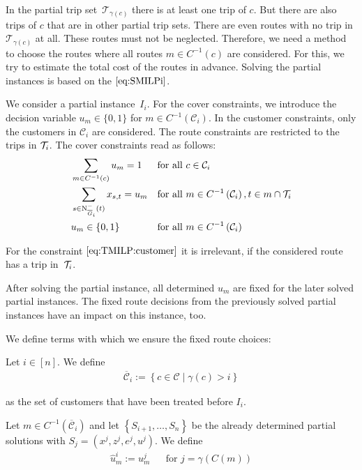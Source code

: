 In the partial trip set~$\mathcal{T}_{\gamma(c)}$ there is at least one trip of $c$. But there are also trips of $c$ that are in other partial trip sets. There are even routes with no trip in $\mathcal{T}_{\gamma(c)}$ at all. These routes must not be neglected. Therefore, we need a method to choose the routes where all routes ${m\in C^{-1}(c)}$ are considered. For this, we try to estimate the total cost of the routes in advance. Solving the partial instances is based on the $\eqref{eq:SMILPi}$.

We consider a partial instance~$I_i$. For the cover constraints, we introduce the decision variable ${u_m\in\{0,1\}}$ for ${m\in C^{-1}\left(\mathcal{C}_i\right)}$. In the customer constraints, only the customers in $\mathcal{C}_i$ are considered. The route constraints are restricted to the trips in $\mathcal{T}_i$. The cover constraints read as follows:
\begin{align}
	& \sum_{m\in C^{-1}(c)} u_m = 1 && \text{for all } c\in\mathcal{C}_i \label{eq:TMILP:customer} \\
	& \sum_{s\in\operatorname{N}_{\overline{G}_i}^-(t)} x_{s,t} = u_m && \text{for all } m\in C^{-1}\left(\mathcal{C}_i\right), t\in m\cap\mathcal{T}_i \label{eq:TMILP:route} \\
	& u_m\in\{0,1\} && \text{for all } m\in C^{-1}\left(\mathcal{C}_i\right) \label{eq:TMILP:um}
\end{align}

For the constraint $\eqref{eq:TMILP:customer}$ it is irrelevant, if the considered route has a trip in~$\mathcal{T}_i$.

After solving the partial instance, all determined $u_m$ are fixed for the later solved partial instances. The fixed route decisions from the previously solved partial instances have an impact on this instance, too. 

We define terms with which we ensure the fixed route choices:

\begin{definition}
\label{def:route_fix}

Let ${i\in[n]}$. We define
\begin{align*}
	\overline{\mathcal{C}}_i := \left\{c\in\mathcal{C}\mid \gamma\left(c\right)>i\right\}
\end{align*}

as the set of customers that have been treated before $I_i$.

Let ${m\in C^{-1}\left(\overline{\mathcal{C}}_i\right)}$ and let $\left\{S_{i+1},\dots,S_n\right\}$ be the already determined partial solutions with ${S_j=\left(x^j,z^j,e^j,u^j\right)}$. We define
\begin{align*}
	\hat{u}^i_m := u^j_m && \text{for } j=\gamma(C(m))
\end{align*}

\end{definition}

